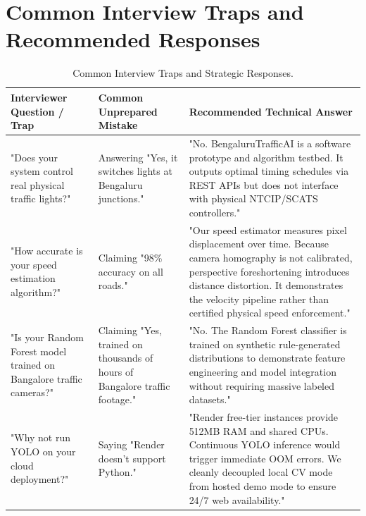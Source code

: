 \section{Common Interview Traps and Recommended Responses}
\label{sec:glossary_traps}

\begin{table}[H]
\centering
\small
\begin{tabularx}{\textwidth}{p{4.2cm} p{4.5cm} X}
\toprule
\textbf{Interviewer Question / Trap} & \textbf{Common Unprepared Mistake} & \textbf{Recommended Technical Answer} \\
\midrule
"Does your system control real physical traffic lights?" & Answering "Yes, it switches lights at Bengaluru junctions." & "No. BengaluruTrafficAI is a software prototype and algorithm testbed. It outputs optimal timing schedules via REST APIs but does not interface with physical NTCIP/SCATS controllers." \\
\midrule
"How accurate is your speed estimation algorithm?" & Claiming "98\% accuracy on all roads." & "Our speed estimator measures pixel displacement over time. Because camera homography is not calibrated, perspective foreshortening introduces distance distortion. It demonstrates the velocity pipeline rather than certified physical speed enforcement." \\
\midrule
"Is your Random Forest model trained on Bangalore traffic cameras?" & Claiming "Yes, trained on thousands of hours of Bangalore traffic footage." & "No. The Random Forest classifier is trained on synthetic rule-generated distributions to demonstrate feature engineering and model integration without requiring massive labeled datasets." \\
\midrule
"Why not run YOLO on your cloud deployment?" & Saying "Render doesn't support Python." & "Render free-tier instances provide 512MB RAM and shared CPUs. Continuous YOLO inference would trigger immediate OOM errors. We cleanly decoupled local CV mode from hosted demo mode to ensure 24/7 web availability." \\
\bottomrule
\end{tabularx}
\caption{Common Interview Traps and Strategic Responses.}
\label{tab:glossary_traps}
\end{table}

